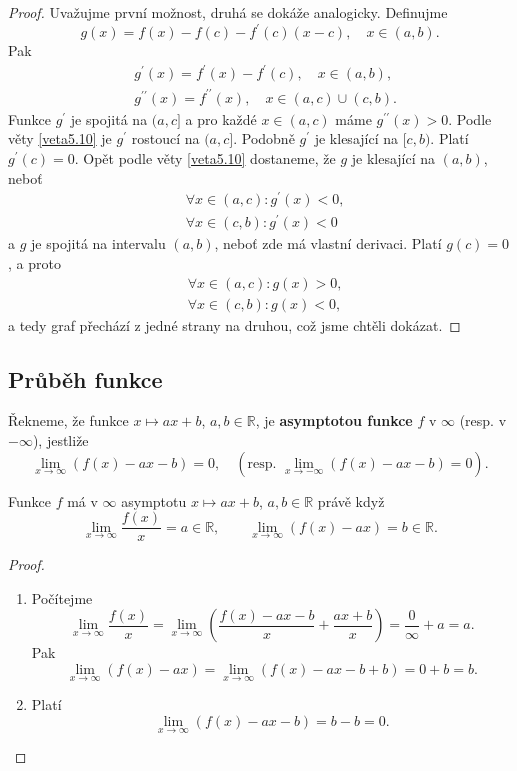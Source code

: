 \begin{proof}
	Uvažujme první možnost, druhá se dokáže analogicky. Definujme
	$$
	    g(x)=f(x)-f(c)-f^\prime(c)(x-c), \quad x \in (a,b).
	$$
	Pak
	\begin{align*}
		&g^\prime(x) = f^\prime(x)-f^\prime(c),\quad x\in (a,b),\\
		&g^{\prime\prime}(x) = f^{\prime\prime}(x), \quad x \in (a,c) \cup (c,b).
	\end{align*}
	Funkce $g^\prime$ je spojitá na $(a,c]$ a pro každé $x \in (a,c)$ máme $g^{\prime\prime}(x)>0$.
	Podle věty \ref{veta5.10} je $g^\prime$ rostoucí na $(a,c]$. Podobně $g^\prime$ je klesající na $[c,b)$.
	Platí $g^\prime(c)=0$. Opět podle věty \ref{veta5.10} dostaneme, že $g$ je klesající na $(a,b)$, neboť
	\begin{align*}
	&\forall x \in (a,c): g^\prime(x) < 0,\\
	&\forall x \in (c,b): g^\prime(x) < 0
	\end{align*}
	a $g$ je spojitá na intervalu $(a,b)$, neboť zde má vlastní derivaci. Platí $g(c)=0$, a proto
	\begin{align*}
	&\forall x \in (a,c): g(x) > 0, \\
	&\forall x \in (c,b): g(x) < 0,
	\end{align*}
	a tedy graf přechází z jedné strany na druhou, což jsme chtěli dokázat.
\end{proof}


\subsection{Průběh funkce}
\begin{definice}
Řekneme, že funkce $x \mapsto ax + b$, $a,b \in \mathbb{R}$, je \textbf{asymptotou funkce} $f$ v $\infty$ (resp. v $-\infty$), jestliže
\[
\lim_{x \to \infty} (f(x) - ax - b) = 0,\quad (\text{resp. } \lim_{x \to -\infty} (f(x) - ax - b) = 0).
\]
\end{definice}

\begin{veta}\label{veta5.19}
Funkce $f$ má v $\infty$ asymptotu $x \mapsto ax + b$, $a,b\in \mathbb R $ právě když
\[
\lim_{x \to \infty} \frac{f(x)}{x} = a\in \mathbb R ,\qquad \lim_{x \to \infty} (f(x) - ax) = b\in \mathbb R .
\]
\end{veta}

\begin{proof}\,
\begin{enumerate}
	\item[$\implies$] Počítejme
	$$
        \lim_{x \to \infty} \frac{f(x)}{x}=\lim_{x \to \infty} \left( \frac{f(x)-ax-b}{x}+\frac{ax+b}{x} \right ) = \frac{0}{\infty}+a = a.
	$$
	Pak
	$$
        \lim_{x \to \infty} (f(x)-ax)=\lim_{x \to \infty} (f(x)-ax-b+b)=0+b = b.
	$$
	\item[$\impliedby$] Platí
	$$
        \lim_{x \to \infty} (f(x)-ax-b) = b-b = 0.
	$$
	\qedhere
\end{enumerate}
\end{proof}

